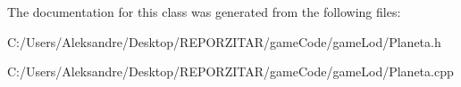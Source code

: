 The documentation for this class was generated from the following files\+:\begin{DoxyCompactItemize}
\item 
C\+:/\+Users/\+Aleksandre/\+Desktop/\+R\+E\+P\+O\+R\+Z\+I\+T\+A\+R/game\+Code/game\+Lod/Planeta.\+h\item 
C\+:/\+Users/\+Aleksandre/\+Desktop/\+R\+E\+P\+O\+R\+Z\+I\+T\+A\+R/game\+Code/game\+Lod/Planeta.\+cpp\end{DoxyCompactItemize}
